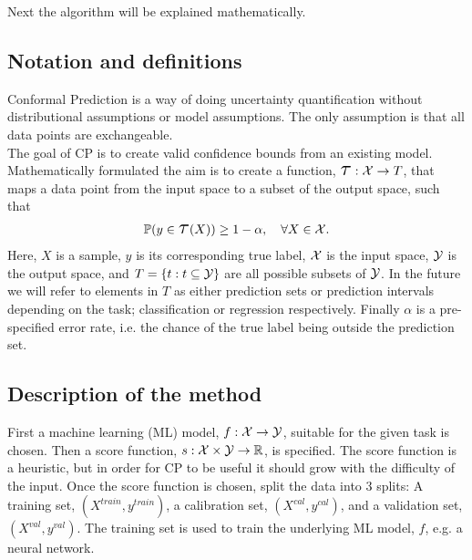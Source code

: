 Next the algorithm will be explained mathematically. 
\subsection{Notation and definitions}
Conformal Prediction is a way of doing uncertainty quantification without distributional assumptions or model assumptions. The only assumption is that all data points are exchangeable.\\
%
The goal of CP is to create valid confidence bounds from an existing model. Mathematically formulated the aim is to create a function, $\Tau: \X \rightarrow T$, that maps a data point from the input space to a subset of the output space, such that
\begin{gather}
\doubleP(y\in\Tau(X)) \geq 1-\alpha, \quad \forall X\in\X.
\label{eq: coverage}
\end{gather}
Here, $X$ is a sample, $y$ is its corresponding true label, $\mathcal{X}$ is the input space, $\mathcal{Y}$ is the output space, and $T = \{t:t\subseteq \mathcal{Y}\}$ are all possible subsets of $\mathcal{Y}$. In the future we will refer to elements in $T$ as either prediction sets or prediction intervals depending on the task; classification or regression respectively. Finally $\alpha$ is a pre-specified error rate, i.e. the chance of the true label being outside the prediction set.
\subsection{Description of the method}
\label{sec: description of method}
First a machine learning (ML) model,
$f: \mathcal{X}\rightarrow \mathcal{Y}$,
suitable for the given task is chosen.
Then a score function,
$s:\mathcal{X}\times\mathcal{Y}\rightarrow\mathbb{R}$,
is specified.
The score function is a heuristic, but in order for CP to be useful it should grow with the difficulty of the input. Once the score function is chosen, split the data into 3 splits: A training set, $(X^{train}, y^{train})$, a calibration set, $(X^{cal}, y^{cal})$, and a validation set, $(X^{val}, y^{val})$. The training set is used to train the underlying ML model, $f$, e.g. a neural network.

